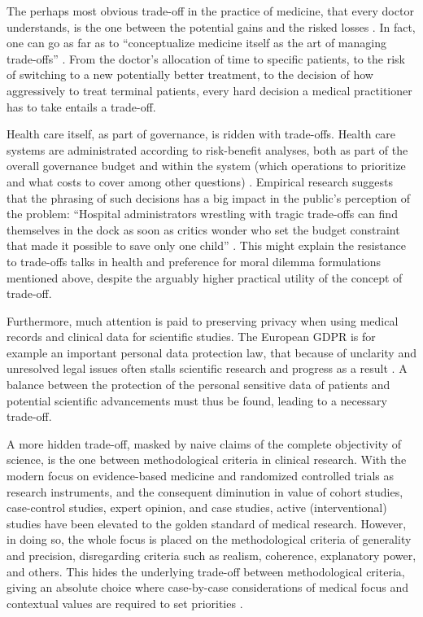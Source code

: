    The perhaps most obvious trade-off in the practice of medicine, that every doctor understands, is the one between the potential gains and the risked losses \cite{Launer2020}.
    In fact, one can go as far as to ``conceptualize medicine itself as the art of managing trade-offs'' \cite[p.~575]{Launer2020}.
    From the doctor's allocation of time to specific patients, to the risk of switching to a new potentially better treatment, to the decision of how aggressively to treat terminal patients, every hard decision a medical practitioner has to take entails a trade-off.

    Health care itself, as part of governance, is ridden with trade-offs.
    Health care systems are administrated according to risk-benefit analyses, both as part of the overall governance budget and within the system (which operations to prioritize and what costs to cover among other questions) \cite{Dionne2018}.
    Empirical research suggests that the phrasing of such decisions has a big impact in the public's perception of the problem:
    ``Hospital administrators wrestling with tragic trade-offs can find themselves in the dock as soon as critics wonder who set the budget constraint that made it possible to save only one child'' \cite[p.~323]{Tetlock2003}.
    This might explain the resistance to trade-offs talks in health and preference for moral dilemma formulations mentioned above, despite the arguably higher practical utility of the concept of trade-off.

    Furthermore, much attention is paid to preserving privacy when using medical records and clinical data for scientific studies.
    The European GDPR is for example an important personal data protection law, that because of unclarity and unresolved legal issues often stalls scientific research and progress as a result \cite{Eiss2020}.
    A balance between the protection of the personal sensitive data of patients and potential scientific advancements must thus be found, leading to a necessary trade-off.

    A more hidden trade-off, masked by naive claims of the complete objectivity of science, is the one between methodological criteria in clinical research.
    With the modern focus on evidence-based medicine and randomized controlled trials as research instruments, and the consequent diminution in value of cohort studies, case-control studies, expert opinion, and case studies, active (interventional) studies have been elevated to the golden standard of medical research.
    However, in doing so, the whole focus is placed on the methodological criteria of generality and precision, disregarding criteria such as realism, coherence, explanatory power, and others.
    This hides the underlying trade-off between methodological criteria, giving an absolute choice where case-by-case considerations of medical focus and contextual values are required to set priorities \cite{Ho2011}.

